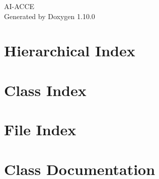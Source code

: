 \documentclass[twoside]{book}
\newcommand{\+}{\discretionary{\mbox{\scriptsize$\hookleftarrow$}}{}{}}
\newcommand{\clearemptydoublepage}{%
    \newpage{\pagestyle{empty}\cleardoublepage}%
  }
\begin{document}
  \raggedbottom
    \hypersetup{pageanchor=false,
                bookmarksnumbered=true,
                pdfencoding=unicode
               }
  \begin{titlepage}
  \vspace*{7cm}
  \begin{center}%
  {\Large AI-\/\+ACCE}\\
  \vspace*{1cm}
  {\large Generated by Doxygen 1.10.0}\\
  \end{center}
  \end{titlepage}
  \clearemptydoublepage
  \tableofcontents
  \clearemptydoublepage
  \hypersetup{pageanchor=true}

\chapter{Hierarchical Index}

\chapter{Class Index}

\chapter{File Index}

\chapter{Class Documentation}



























\end{document}
